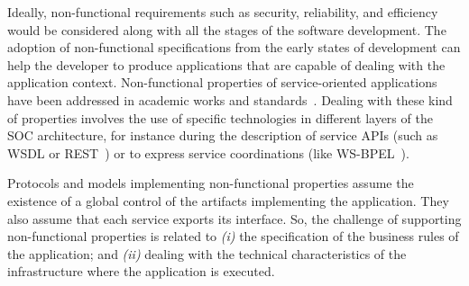 Ideally, non-functional requirements such as
security, reliability, and efficiency
would be considered along with all the stages of the software development. The
adoption of non-functional specifications from the early states of development
can help the developer to produce applications that are capable of dealing with
the application context.
%
%
Non-functional properties of service-oriented applications  have been
addressed in academic works and standards~\cite{ws-co,ws-tra,wsci}.
Dealing with these kind of properties involves the use of specific technologies
in different layers of the SOC architecture, for instance during the description
of service APIs (such as WSDL\cite{wsdl} or REST~\cite{rest}) or to express
service coordinations (like WS-BPEL~\cite{bpel03}).


Protocols and models implementing non-functional properties assume the existence of a global control of the artifacts implementing the application.
They also assume that each service exports its interface.
So, the challenge of supporting non-functional properties is related to
\textit{(i)} the specification of the business rules of the application; and 
\textit{(ii)} dealing with the technical characteristics of the infrastructure where the application is executed.

